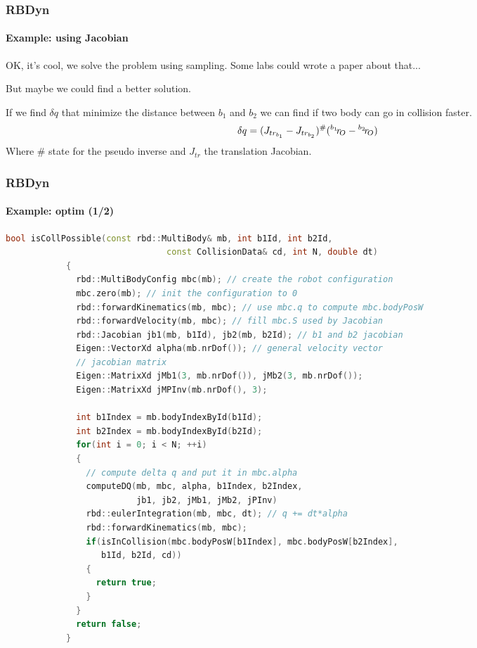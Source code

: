 \documentclass{beamer}
\begin{document}
	\begin{frame}
		\frametitle{RBDyn}
		\framesubtitle{Example: using Jacobian}
		OK, it's cool, we solve the problem using sampling.
		Some labs could wrote a paper about that...
		\\ \hfill

		But maybe we could find a better solution.
		\\ \hfill

		If we find $ \delta q $ that minimize the distance between $ b_1 $ and $ b_2 $
		we can find if two body can go in collision faster.
		$$
		\delta q = (J_{tr_{b_1}} - J_{tr_{b_2}})^{\#} (\translation{O}{{b_1}} - \translation{O}{{b_2}})
		$$
		Where $ \# $ state for the pseudo inverse and $ J_{tr} $ the translation Jacobian.
	\end{frame}
	\begin{frame}[fragile]
		\frametitle{RBDyn}
		\framesubtitle{Example: optim (1/2)}
		\begin{lstlisting}[language=C++,basicstyle=\tiny]
			bool isCollPossible(const rbd::MultiBody& mb, int b1Id, int b2Id,
			                    const CollisionData& cd, int N, double dt)
			{
			  rbd::MultiBodyConfig mbc(mb); // create the robot configuration
			  mbc.zero(mb); // init the configuration to 0
			  rbd::forwardKinematics(mb, mbc); // use mbc.q to compute mbc.bodyPosW
			  rbd::forwardVelocity(mb, mbc); // fill mbc.S used by Jacobian
			  rbd::Jacobian jb1(mb, b1Id), jb2(mb, b2Id); // b1 and b2 jacobian
			  Eigen::VectorXd alpha(mb.nrDof()); // general velocity vector
			  // jacobian matrix
			  Eigen::MatrixXd jMb1(3, mb.nrDof()), jMb2(3, mb.nrDof());
			  Eigen::MatrixXd jMPInv(mb.nrDof(), 3);

			  int b1Index = mb.bodyIndexById(b1Id);
			  int b2Index = mb.bodyIndexById(b2Id);
			  for(int i = 0; i < N; ++i)
			  {
			    // compute delta q and put it in mbc.alpha
			    computeDQ(mb, mbc, alpha, b1Index, b2Index,
			              jb1, jb2, jMb1, jMb2, jPInv)
			    rbd::eulerIntegration(mb, mbc, dt); // q += dt*alpha
			    rbd::forwardKinematics(mb, mbc);
			    if(isInCollision(mbc.bodyPosW[b1Index], mbc.bodyPosW[b2Index],
			       b1Id, b2Id, cd))
			    {
			      return true;
			    }
			  }
			  return false;
			}
		\end{lstlisting}
	\end{frame}
\end{document}
